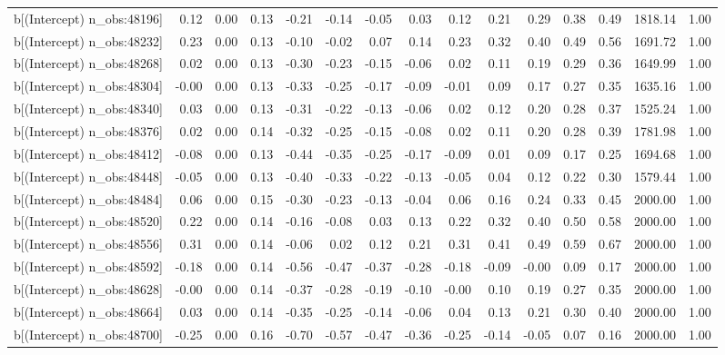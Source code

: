 \begin{table}[ht]
\begin{tabular}{rrrrrrrrrrrrrrr}
  b[(Intercept) n\_obs:48196] & 0.12 & 0.00 & 0.13 & -0.21 & -0.14 & -0.05 & 0.03 & 0.12 & 0.21 & 0.29 & 0.38 & 0.49 & 1818.14 & 1.00 \\ 
  b[(Intercept) n\_obs:48232] & 0.23 & 0.00 & 0.13 & -0.10 & -0.02 & 0.07 & 0.14 & 0.23 & 0.32 & 0.40 & 0.49 & 0.56 & 1691.72 & 1.00 \\ 
  b[(Intercept) n\_obs:48268] & 0.02 & 0.00 & 0.13 & -0.30 & -0.23 & -0.15 & -0.06 & 0.02 & 0.11 & 0.19 & 0.29 & 0.36 & 1649.99 & 1.00 \\ 
  b[(Intercept) n\_obs:48304] & -0.00 & 0.00 & 0.13 & -0.33 & -0.25 & -0.17 & -0.09 & -0.01 & 0.09 & 0.17 & 0.27 & 0.35 & 1635.16 & 1.00 \\ 
  b[(Intercept) n\_obs:48340] & 0.03 & 0.00 & 0.13 & -0.31 & -0.22 & -0.13 & -0.06 & 0.02 & 0.12 & 0.20 & 0.28 & 0.37 & 1525.24 & 1.00 \\ 
  b[(Intercept) n\_obs:48376] & 0.02 & 0.00 & 0.14 & -0.32 & -0.25 & -0.15 & -0.08 & 0.02 & 0.11 & 0.20 & 0.28 & 0.39 & 1781.98 & 1.00 \\ 
  b[(Intercept) n\_obs:48412] & -0.08 & 0.00 & 0.13 & -0.44 & -0.35 & -0.25 & -0.17 & -0.09 & 0.01 & 0.09 & 0.17 & 0.25 & 1694.68 & 1.00 \\ 
  b[(Intercept) n\_obs:48448] & -0.05 & 0.00 & 0.13 & -0.40 & -0.33 & -0.22 & -0.13 & -0.05 & 0.04 & 0.12 & 0.22 & 0.30 & 1579.44 & 1.00 \\ 
  b[(Intercept) n\_obs:48484] & 0.06 & 0.00 & 0.15 & -0.30 & -0.23 & -0.13 & -0.04 & 0.06 & 0.16 & 0.24 & 0.33 & 0.45 & 2000.00 & 1.00 \\ 
  b[(Intercept) n\_obs:48520] & 0.22 & 0.00 & 0.14 & -0.16 & -0.08 & 0.03 & 0.13 & 0.22 & 0.32 & 0.40 & 0.50 & 0.58 & 2000.00 & 1.00 \\ 
  b[(Intercept) n\_obs:48556] & 0.31 & 0.00 & 0.14 & -0.06 & 0.02 & 0.12 & 0.21 & 0.31 & 0.41 & 0.49 & 0.59 & 0.67 & 2000.00 & 1.00 \\ 
  b[(Intercept) n\_obs:48592] & -0.18 & 0.00 & 0.14 & -0.56 & -0.47 & -0.37 & -0.28 & -0.18 & -0.09 & -0.00 & 0.09 & 0.17 & 2000.00 & 1.00 \\ 
  b[(Intercept) n\_obs:48628] & -0.00 & 0.00 & 0.14 & -0.37 & -0.28 & -0.19 & -0.10 & -0.00 & 0.10 & 0.19 & 0.27 & 0.35 & 2000.00 & 1.00 \\ 
  b[(Intercept) n\_obs:48664] & 0.03 & 0.00 & 0.14 & -0.35 & -0.25 & -0.14 & -0.06 & 0.04 & 0.13 & 0.21 & 0.30 & 0.40 & 2000.00 & 1.00 \\ 
  b[(Intercept) n\_obs:48700] & -0.25 & 0.00 & 0.16 & -0.70 & -0.57 & -0.47 & -0.36 & -0.25 & -0.14 & -0.05 & 0.07 & 0.16 & 2000.00 & 1.00 \\ 

\end{tabular}
\end{table}
